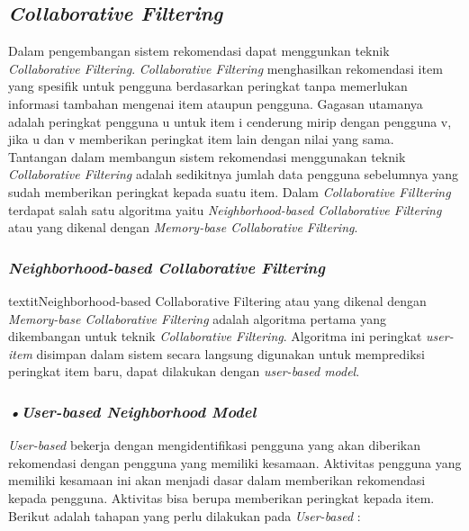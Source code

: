 \subsection{\textit{Collaborative Filtering}}
\label{sec:collaborative filtering}
	Dalam pengembangan sistem rekomendasi dapat menggunkan teknik \textit{Collaborative Filtering}. \textit{Collaborative Filtering} menghasilkan rekomendasi item yang spesifik untuk pengguna berdasarkan peringkat tanpa memerlukan informasi tambahan mengenai item ataupun pengguna. Gagasan utamanya adalah peringkat pengguna u untuk item i cenderung mirip dengan pengguna v, jika u dan v memberikan peringkat item lain dengan nilai yang sama. \\%
	Tantangan dalam membangun sistem rekomendasi menggunakan teknik \textit{Collaborative Filtering} adalah sedikitnya jumlah data pengguna sebelumnya yang sudah memberikan peringkat kepada suatu item. Dalam \textit{Collaborative Filltering} terdapat salah satu algoritma yaitu \textit{Neighborhood-based Collaborative Filtering} atau yang dikenal dengan \textit{Memory-base Collaborative Filtering}.
	
\subsubsection{\textit{Neighborhood-based Collaborative Filtering}}
textit{Neighborhood-based Collaborative Filtering} atau yang dikenal dengan \textit{Memory-base Collaborative Filtering} adalah algoritma pertama yang dikembangan untuk teknik \textit{Collaborative Filtering}. Algoritma ini peringkat \textit{user-item} disimpan dalam sistem secara langsung digunakan untuk memprediksi peringkat item baru, dapat dilakukan dengan \textit{user-based model}. %

\subsubsection{\textit{•User-based Neighborhood Model}}
\textit{User-based} bekerja dengan mengidentifikasi pengguna yang akan diberikan rekomendasi dengan pengguna yang memiliki kesamaan. Aktivitas pengguna yang memiliki kesamaan ini akan menjadi dasar dalam memberikan rekomendasi kepada pengguna. Aktivitas bisa berupa memberikan peringkat kepada item. Berikut adalah tahapan yang perlu dilakukan pada \textit{User-based} : 

